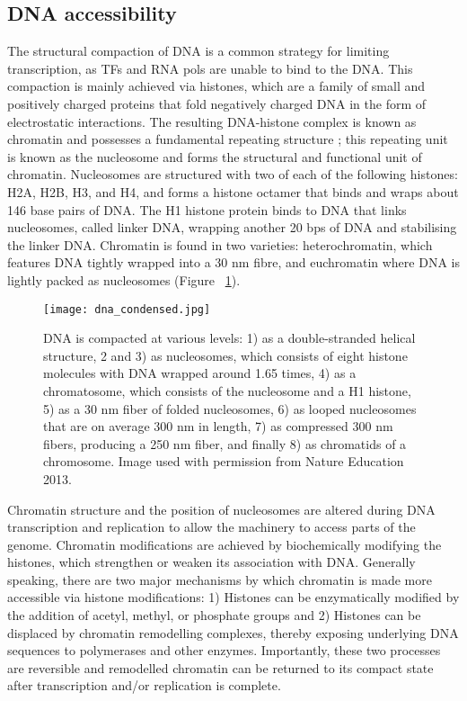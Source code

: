 \subsection{DNA accessibility}

The structural compaction of DNA is a common strategy for limiting transcription, as TFs and RNA pols are unable to bind to the DNA. This compaction is mainly achieved via histones, which are a family of small and positively charged proteins that fold negatively charged DNA in the form of electrostatic interactions. The resulting DNA-histone complex is known as chromatin and possesses a fundamental repeating structure \citep{holde01111974}; this repeating unit is known as the nucleosome and forms the structural and functional unit of chromatin. Nucleosomes are structured with two of each of the following histones: H2A, H2B, H3, and H4, and forms a histone octamer that binds and wraps about 146 base pairs of DNA. The H1 histone protein binds to DNA that links nucleosomes, called linker DNA, wrapping another 20 bps of DNA and stabilising the linker DNA. Chromatin is found in two varieties: heterochromatin, which features DNA tightly wrapped into a 30 nm fibre, and euchromatin where DNA is lightly packed as nucleosomes (Figure ~\ref{fig:dna_condensed}).

\begin{figure}[!ht]
   \centering
   \texttt{[image: dna\_condensed.jpg]}
   \caption[DNA packaging]{DNA is compacted at various levels: 1) as a double-stranded helical structure, 2 and 3) as nucleosomes, which consists of eight histone molecules with DNA wrapped around 1.65 times, 4) as a chromatosome, which consists of the nucleosome and a H1 histone, 5) as a 30 nm fiber of folded nucleosomes, 6) as looped nucleosomes that are on average 300 nm in length, 7) as compressed 300 nm fibers, producing a 250 nm fiber, and finally 8) as chromatids of a chromosome. Image used with permission from Nature Education 2013.}
   \label{fig:dna_condensed}
\end{figure}

Chromatin structure and the position of nucleosomes are altered during DNA transcription and replication to allow the machinery to access parts of the genome. Chromatin modifications are achieved by biochemically modifying the histones, which strengthen or weaken its association with DNA. Generally speaking, there are two major mechanisms by which chromatin is made more accessible via histone modifications: 1) Histones can be enzymatically modified by the addition of acetyl, methyl, or phosphate groups and 2) Histones can be displaced by chromatin remodelling complexes, thereby exposing underlying DNA sequences to polymerases and other enzymes. Importantly, these two processes are reversible and remodelled chromatin can be returned to its compact state after transcription and/or replication is complete.


